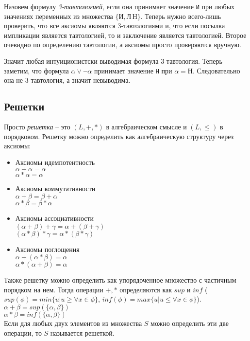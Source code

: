 Назовем формулу \emph{3-тавтологией}, если она принимает значение
\texttt{И} при любых значениях переменных из множества $\{\texttt{И}, \texttt{Л}\, \texttt{Н}\}$. Теперь нужно всего-лишь проверить, что все аксиомы являются 3-тавтологиями и, что если посылка импликации является тавтологией, то и заключение является тавтологией. Второе очевидно по определению тавтологии, а аксиомы просто проверяются вручную.

Значит любая интуиционистски выводимая формула 3-тавтология. Теперь заметим, что формула $\alpha \vee \neg \alpha$ принимает значение \texttt{Н} при $\alpha = \texttt{Н}$. Следовательно она не 3-тавтология, а значит невыводима.
\subsection{Решетки}
\label{sec-5-3}
Просто \emph{решетка} -- это $(L, +, *)$ в алгебраическом смысле и $(L, \leq)$ в порядковом. Решетку можно определить как алгебраическую структуру через аксиомы: 
\begin{itemize}
\item Аксиомы идемпотентность\\
$\alpha + \alpha = \alpha$\\
$\alpha * \alpha = \alpha$
\item Аксиомы коммутативности\\
$\alpha + \beta = \beta + \alpha$\\
$\alpha * \beta = \beta * \alpha$
\item Аксиомы ассоциативности\\
$(\alpha + \beta) + \gamma = \alpha + (\beta + \gamma)$\\
$(\alpha * \beta) * \gamma = \alpha * (\beta * \gamma)$
\item Аксиомы поглощения\\
$\alpha + (\alpha * \beta) = \alpha$\\
$\alpha * (\alpha + \beta) = \alpha$
\end{itemize} 
Также решетку можно определить как упорядоченное множество с частичным порядком на нем. Тогда операции $+, *$ определяются как $sup$ и $inf$ ($sup(\phi) = min \lbrace u \vert u \geq \forall x \in \phi \rbrace$,  $inf(\phi) = max \lbrace u \vert u \leq \forall x \in \phi \rbrace$).\\
$\alpha + \beta = sup (\lbrace \alpha, \beta \rbrace)$\\
$\alpha * \beta = inf (\lbrace \alpha, \beta \rbrace)$\\
Если для любых двух элементов из множества $S$ можно определить эти две операции, то $S$ называется решеткой.

